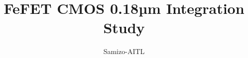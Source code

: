 \documentclass[journal]{IEEEtran}
\begin{document}
\title{FeFET CMOS 0.18µm Integration Study}
\author{Samizo-AITL}

\maketitle

\begin{abstract}

\end{abstract}








\end{document}
